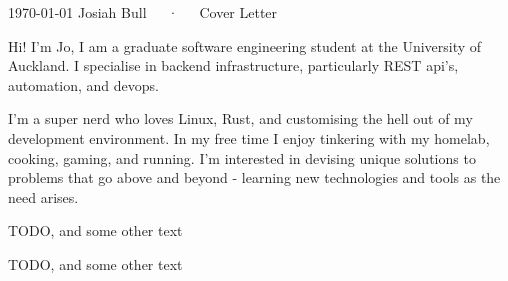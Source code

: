 \documentclass[11pt, a4paper]{awesome-cv}
\begin{document}
\makecvheader[C]

\makecvfooter
  {\today}
  {Josiah Bull~~~·~~~Cover Letter}
  {\thepage}


\begin{cvletter}

Hi! I'm Jo, I am a graduate software engineering student at the University of Auckland. I specialise in backend infrastructure, particularly REST api's, automation, and devops.

I'm a super nerd who loves Linux, Rust, and customising the hell out of my development environment. In my free time I enjoy tinkering with my homelab, cooking, gaming, and running. I'm interested in devising unique solutions to problems that go above and beyond - learning new technologies and tools as the need arises.


TODO, and some other text

TODO, and some other text

\end{cvletter}


\makeletterclosing
\end{document}
